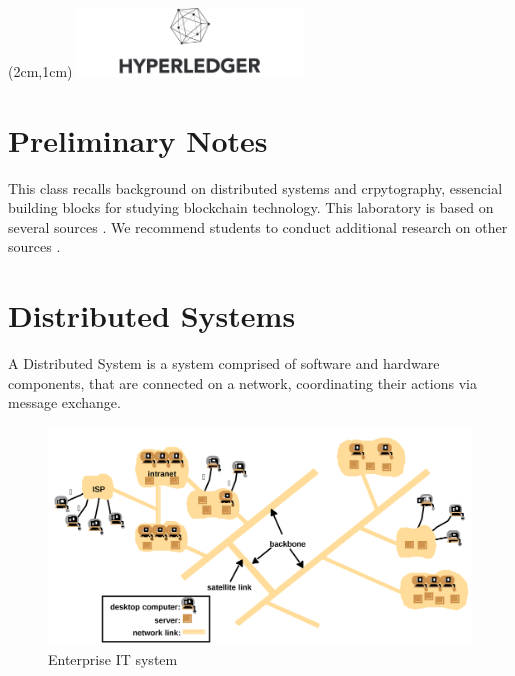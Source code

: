 \documentclass[12pt,a4paper]{article}
\begin{document}
\textblockorigin{-34pt}{-12pt}
\begin{textblock*}{10cm}(2cm,1cm)
\includegraphics[width=6cm]{hyperledger.png}
\end{textblock*}

\section*{Preliminary Notes}
This class recalls background on distributed systems and crpytography, essencial building blocks for studying blockchain technology. This laboratory is based on several sources \cite{dscd,sdist2017,Wong2014,Ousterhout_presentation,Verissimo2001,correia2019byzantine,raft_paper}. We recommend students to conduct additional research on other sources \cite{mit,princeton}.





\section{Distributed Systems}
\label{sec:ds}
A Distributed System is a system comprised of software and hardware components, that are connected on a network, coordinating their actions via message exchange. 

\begin{figure}[h!]
    \centering
    \includegraphics[scale=0.25]{figures/itsystem.png}
    \caption{Enterprise IT system \cite{Wong2014}}
    \label{fig:internet}
\end{figure}
\end{document}
